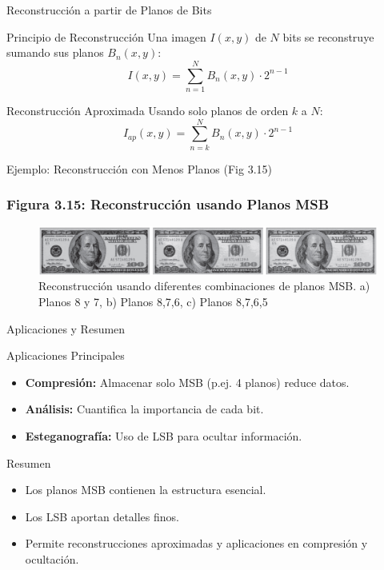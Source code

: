 \documentclass{beamer}
\begin{document}
\begin{frame}{Reconstrucción a partir de Planos de Bits}
  \begin{block}{Principio de Reconstrucción}
    Una imagen $I(x,y)$ de $N$ bits se reconstruye sumando sus planos $B_n(x,y)$:
    \[
      I(x,y) = \sum_{n=1}^{N} B_n(x,y) \cdot 2^{n-1}
    \]
  \end{block}

  \begin{exampleblock}{Reconstrucción Aproximada}
    Usando solo planos de orden $k$ a $N$:
    \[
      I_{ap}(x,y) = \sum_{n=k}^{N} B_n(x,y) \cdot 2^{n-1}
    \]
  \end{exampleblock}
\end{frame}

\begin{frame}{Ejemplo: Reconstrucción con Menos Planos (Fig 3.15)}
  \frametitle{Figura 3.15: Reconstrucción usando Planos MSB}

  \begin{figure}[H]
    \centering
      \includegraphics[width=\linewidth]{figuras/Fig_3_15.png}
    \caption{Reconstrucción usando diferentes combinaciones de planos MSB. a) Planos 8 y 7, b) Planos 8,7,6, c) Planos 8,7,6,5}
    \label{fig:reconstruction_example}
  \end{figure}
\end{frame}

\begin{frame}{Aplicaciones y Resumen}
  \begin{block}{Aplicaciones Principales}
    \begin{itemize}
      \item \textbf{Compresión:} Almacenar solo MSB (p.ej. 4 planos) reduce datos.
      \item \textbf{Análisis:} Cuantifica la importancia de cada bit.
      \item \textbf{Esteganografía:} Uso de LSB para ocultar información.
    \end{itemize}
  \end{block}

  \begin{exampleblock}{Resumen}
    \begin{itemize}
      \item Los planos MSB contienen la estructura esencial.
      \item Los LSB aportan detalles finos.
      \item Permite reconstrucciones aproximadas y aplicaciones en compresión y ocultación.
    \end{itemize}
  \end{exampleblock}
\end{frame}
\end{document}
